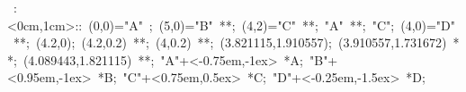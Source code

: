

\hbox{
\xy    <1cm,0cm>:<0cm,1cm>::
       (0,0)="A" ; (5,0)="B" **\dir{-}; 
       (4,2)="C" **\dir{-};  "A" **\dir{-};
       "C"; (4,0)="D" **\dir{-}; 
       (4.2,0); (4.2,0.2) **\dir{-}; (4,0.2) **\dir{-}; 
       (3.821115,1.910557); (3.910557,1.731672) **\dir{-}; (4.089443,1.821115) **\dir{-}; 
       "A"+<-0.75em,-1ex> *{A};
       "B"+<0.95em,-1ex> *{B};
       "C"+<0.75em,0.5ex> *{C};
       "D"+<-0.25em,-1.5ex> *{D};
\endxy}
	   
